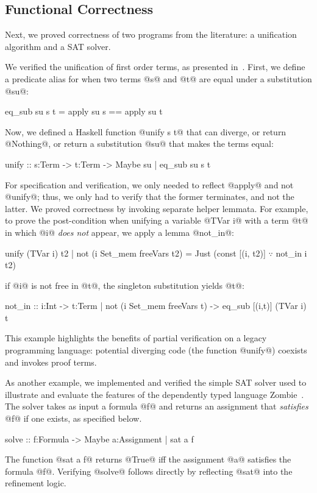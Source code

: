 \subsection{Functional Correctness} \label{subsec:programs}

Next, we proved correctness of two programs
from the literature: a unification
algorithm and a SAT solver.

%
We verified the
unification of first order terms, as
presented in~\citep{Sjoberg2015}.
%
First, we define a predicate alias for
when two terms @s@ and @t@ are equal
under a substitution @su@:
%
\begin{code}
  eq_sub su s t = apply su s == apply su t
\end{code}
%
Now, we defined a Haskell function
@unify s t@ that can diverge, or return
@Nothing@, or return a substitution @su@
that makes the terms equal:
%
\begin{code}
  unify :: s:Term -> t:Term -> Maybe {su | eq_sub su s t}
\end{code}
%
For specification and verification,
we only needed to reflect @apply@ and
not @unify@; thus, we only had to verify
that the former terminates, and not the latter.
%
We proved correctness by invoking
separate helper lemmata.
%
For example, to prove the post-condition
when unifying a variable @TVar i@ with
a term @t@ in which @i@ \emph{does not}
appear, we apply a lemma @not_in@:
%
\begin{mcode}
  unify (TVar i) t2 | not (i Set_mem freeVars t2) = Just (const [(i, t2)] $\because$ not_in i t2)
\end{mcode}
\ie if @i@ is not free in @t@,
the singleton substitution yields @t@:
%
\begin{code}
  not_in :: i:Int -> t:{Term | not (i Set_mem freeVars t)} -> {eq_sub [(i,t)] (TVar i) t}
\end{code}
%
This example highlights the benefits of
partial verification on a legacy programming language:
potential diverging code (\eg the function @unify@) coexists and invokes proof terms.

%
As another example, we implemented and verified the simple
SAT solver used to illustrate and evaluate
the features of the dependently typed language
Zombie~\citep{Zombie}.
%
The solver takes as input a formula @f@
and returns an assignment that
\emph{satisfies} @f@ if one exists,
as specified below.
%
\begin{code}
  solve :: f:Formula -> Maybe {a:Assignment | sat a f}
\end{code}
%
The function @sat a f@ returns @True@ iff the assignment
@a@ satisfies the formula @f@.
%
Verifying @solve@ follows directly by
reflecting @sat@ into the refinement logic.

